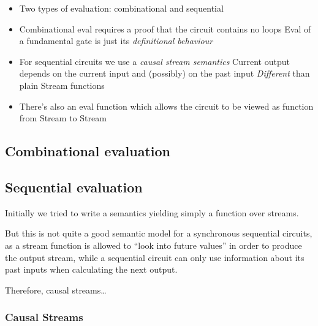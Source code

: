         \begin{itemize}
            \item Two types of evaluation: combinational and sequential
            \item Combinational eval requires a proof that the circuit contains no loops
                \subitem Eval of a fundamental gate is just its \emph{definitional behaviour}

            \item For sequential circuits we use a \emph{causal stream semantics}
                \subitem Current output depends on the current input and (possibly) on the past input
                \subitem \emph{Different} than plain Stream functions

            \item There's also an eval function which allows the circuit to be viewed as function from Stream to Stream
        \end{itemize}

        \subsection{Combinational evaluation}
        \label{subsec:combinational-eval}

        \subsection{Sequential evaluation}
        \label{subsec:sequential-eval}
            Initially we tried to write a semantics yielding simply a function over streams.

            But this is not quite a good semantic model for a synchronous sequential circuits,
            as a stream function is allowed to ``look into future values'' in order to produce
            the output stream, while a sequential circuit can only use information about its past inputs
            when calculating the next output.

            Therefore, causal streams\ldots

            \subsubsection{Causal Streams}
